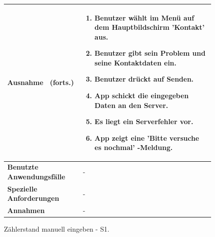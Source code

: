 \begin{figure}[H]
	\begin{tabularx}{\textwidth}{ X | X }
	\hline
	\textbf{Ausnahme} \ (forts.)&
		\begin{enumerate}
			\item Benutzer wählt im Menü auf dem Hauptbildschirm 'Kontakt' aus. 
			\item Benutzer gibt sein Problem und seine Kontaktdaten ein.
			\item Benutzer drückt auf Senden.
			\item App schickt die eingegeben Daten an den Server.
			\item Es liegt ein Serverfehler vor.
			\item App zeigt eine 'Bitte versuche es nochmal' -Meldung.
		\end{enumerate} \\ \hline
		\textbf{Benutzte Anwendungsfälle} & - \\ \hline
		\textbf{Spezielle Anforderungen} & - \\ \hline
		\textbf{Annahmen} & -
	\end{tabularx}
	\caption{Zählerstand manuell eingeben - S1.}
	\label{fig:anwendungsfall-server-tabelle-xx-1}
\end{figure}
